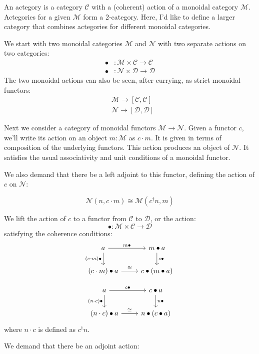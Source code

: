 \documentclass[11pt]{amsart}
\newcommand{\cat}[1]{\mathcal{#1}}%
\begin{document}
An actegory is a category $\cat C$ with a (coherent) action of a monoidal category $\cat M$. Actegories for a given $\cat M$ form a 2-category. Here, I'd like to define a larger category that combines actegories for different monoidal categories.

We start with two monoidal categories $\cat M$ and $\cat N$ with two separate actions on two categories:
\begin{align*} 
\bullet &\colon \cat M \times \cat C \to \cat C 
\\
 \bullet &\colon \cat N \times \cat D \to \cat D 
\end{align*}
The two monoidal actions can also be seen, after currying, as strict monoidal functors:
\begin{align*}
&\cat M \to [\cat C, \cat C]
\\
&\cat N \to [\cat D, \cat D]
\end{align*}

Next we consider a category of monoidal functors $\cat M \to \cat N$. Given a functor $c$, we'll write its action on an object $m \colon \cat M$ as $c \cdot m$. It is given in terms of composition of the underlying functors. This action produces an object of $\cat N$. It satisfies the usual associativity and unit conditions of a monoidal functor. 

We also demand that there be a left adjoint to this functor, defining the action of $c$ on $\cat N$:

\[ \cat N (n, c \cdot m) \cong \cat M (c^{\dagger} n, m) \]

We lift the action of $c$ to a functor from $\cat C$ to  $\cat D$, or the action:
\[ \bullet \colon \cat M \times \cat C \to \cat D \]
satisfying the coherence conditions:
\[
 \begin{tikzcd}
 a
 \arrow [r, "m \bullet"] 
 \arrow [d, "(c \cdot m) \bullet"']
 & m \bullet a
 \arrow [d, "c \bullet"]
 \\
 (c \cdot m) \bullet a
 \arrow [r, "\cong"]
 & c \bullet (m \bullet a)
 \end{tikzcd}
\]

\[
 \begin{tikzcd}
 a
 \arrow [r, "c \bullet"] 
 \arrow [d, "(n \cdot c) \bullet"']
 & c \bullet a
 \arrow [d, "n \bullet"]
 \\
 (n \cdot c) \bullet a
 \arrow [r, "\cong"]
 & n \bullet (c \bullet a)
 \end{tikzcd}
\]
where $n \cdot c$ is defined as $c^{\dagger} n$.

We demand that there be an adjoint action:
\end{document}
